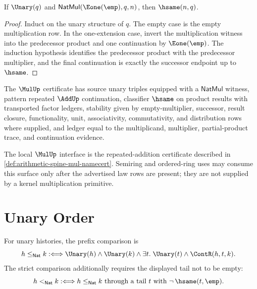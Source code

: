 \begin{theorem}
\label{thm:arithmetic-spine-unit-mul-readback}
If $\Unary(q)$ and $\mathsf{NatMul}(\Eone(\emp),q,n)$, then
$\hsame(n,q)$.
\end{theorem}

\begin{proof}
Induct on the unary structure of $q$.  The empty case is the empty
multiplication row.  In the one-extension case, invert the multiplication
witness into the predecessor product and one continuation by
$\Eone(\emp)$.  The induction hypothesis identifies the predecessor product
with the predecessor multiplier, and the final continuation is exactly the
successor endpoint up to $\hsame$.
\end{proof}

\begin{definition}
\label{def:arithmetic-spine-mul-namecert}
The $\MulUp$ certificate has source unary triples equipped with a
$\mathsf{NatMul}$ witness, pattern repeated $\AddUp$ continuation, classifier
$\hsame$ on product results with transported factor ledgers, stability given
by empty-multiplier, successor, result closure, functionality, unit,
associativity, commutativity, and distribution rows where supplied, and
ledger equal to the multiplicand, multiplier, partial-product trace, and
continuation evidence.
\end{definition}

\begin{corollary}
\label{cor:arithmetic-spine-mul-admission}
The local $\MulUp$ interface is the repeated-addition certificate described
in \autoref{def:arithmetic-spine-mul-namecert}.  Semiring and ordered-ring
uses may consume this surface only after the advertised law rows are present;
they are not supplied by a kernel multiplication primitive.
\end{corollary}

\section{Unary Order}
\label{sec:arithmetic-spine-order}

\begin{definition}
\label{def:arithmetic-spine-unary-prefix-order}
For unary histories, the prefix comparison is
$$
h\le_{\mathsf{Nat}} k
:\Longleftrightarrow
\Unary(h)\wedge\Unary(k)\wedge
\exists t.\;\Unary(t)\wedge\ContR(h,t,k).
$$
The strict comparison additionally requires the displayed tail not to be
empty:
$$
h<_{\mathsf{Nat}} k
:\Longleftrightarrow
h\le_{\mathsf{Nat}}k
\text{ through a tail }t
\text{ with }\neg\,\hsame(t,\emp).
$$
\end{definition}

